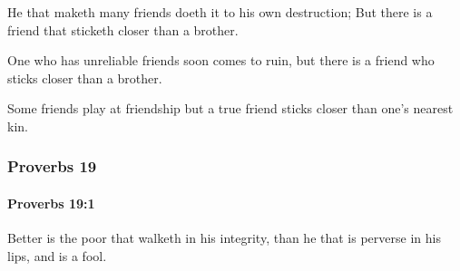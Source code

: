 			\begin{versebox}
					\item[BHS] 
					\item[ASV] He that maketh many friends doeth it to his own destruction; But there is a friend that sticketh closer than a brother.
					\item[NIV] One who has unreliable friends soon comes to ruin, but there is a friend who sticks closer than a brother.
					\item[NRSV] Some friends play at friendship but a true friend sticks closer than one’s nearest kin.
			\end{versebox}
	\subsubsection{Proverbs 19} %
		\label{PROVERBS-19}

		\paragraph{Proverbs 19:1} %
			\label{PROVERBS-19-1}

			Better is the poor that walketh in his integrity, than he that is perverse in his lips, and is a fool.

